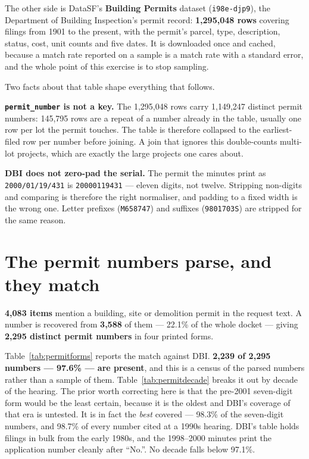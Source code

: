 \documentclass[11pt]{article}
\begin{document}
The other side is DataSF's \textbf{Building Permits} dataset (\texttt{i98e-djp9}), the
Department of Building Inspection's permit record: \textbf{1{,}295{,}048 rows} covering
filings from 1901 to the present, with the permit's parcel, type, description, status, cost,
unit counts and five dates. It is downloaded once and cached, because a match rate reported
on a sample is a match rate with a standard error, and the whole point of this exercise is to
stop sampling.

Two facts about that table shape everything that follows.

\textbf{\texttt{permit\_number} is not a key.} The 1{,}295{,}048 rows carry 1{,}149{,}247
distinct permit numbers: 145{,}795 rows are a repeat of a number already in the table,
usually one row per lot the permit touches. The table is therefore collapsed to the
earliest-filed row per number before joining. A join that ignores this double-counts multi-lot projects, which are exactly
the large projects one cares about.

\textbf{DBI does not zero-pad the serial.} The permit the minutes print as
\texttt{2000/01/19/431} is \texttt{20000119431} --- eleven digits, not twelve. Stripping
non-digits and comparing is therefore the right normaliser, and padding to a fixed width is
the wrong one. Letter prefixes (\texttt{M658747}) and suffixes (\texttt{9801703S}) are
stripped for the same reason.

\section{The permit numbers parse, and they match}

\textbf{4{,}083 items} mention a building, site or demolition permit in the request text. A
number is recovered from \textbf{3{,}588} of them --- 22.1\% of the whole docket --- giving
\textbf{2{,}295 distinct permit numbers} in four printed forms.



Table~\ref{tab:permitforms} reports the match against DBI. \textbf{2{,}239 of 2{,}295 numbers
--- 97.6\% --- are present}, and this is a census of the parsed numbers rather than a sample
of them. Table~\ref{tab:permitdecade} breaks it out by decade of the hearing. The prior worth
correcting here is that the pre-2001 seven-digit form would be the least certain, because it
is the oldest and DBI's coverage of that era is untested. It is in fact the \emph{best}
covered --- 98.3\% of the seven-digit numbers, and 98.7\% of every number cited at a 1990s
hearing. DBI's table holds filings in bulk from the early 1980s, and the 1998--2000 minutes
print the application number cleanly after ``No.''. No decade falls below 97.1\%.
\end{document}
